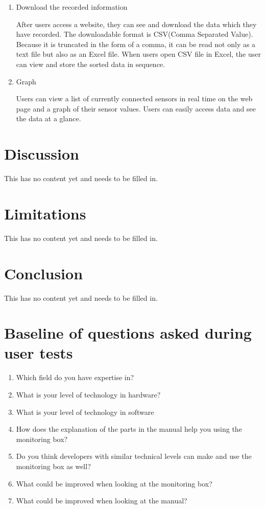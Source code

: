 \documentclass[conference]{IEEEtran}
\begin{document}
\begin{enumerate}
\begin{enumerate}
\begin{enumerate}
\item Download the recorded information

 After users access a website, they can see and download the data which they have recorded. The downloadable format is CSV(Comma Separated Value). Because it is truncated in the form of a comma, it can be read not only as a text file but also as an Excel file. When users open CSV file in Excel, the user can view and store the sorted data in sequence.\\

\item Graph

 Users can view a list of currently connected sensors in real time on the web page and a graph of their sensor values. Users can easily access data and see the data at a glance.\\

\end{enumerate}
\end{enumerate}
 
\end{enumerate}

\section{Discussion}
This has no content yet and needs to be filled in. 

\section{Limitations}
This has no content yet and needs to be filled in. 

\section{Conclusion}
This has no content yet and needs to be filled in. 



\appendices
\section{Baseline of questions asked during user tests}
\begin{enumerate}
\item Which field do you have expertise in?
\item What is your level of technology in hardware?
\item What is your level of technology in software
\item How does the explanation of the parts in the manual help you using the monitoring box?
\item Do you think developers with similar technical levels can make and use the monitoring box as well?\item What could be improved when looking at the monitoring box?
\item What could be improved when looking at the manual?
\end{enumerate}
\end{document}
